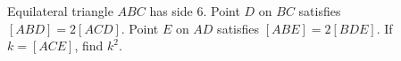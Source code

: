 Equilateral triangle $ABC$ has side $6$. Point $D$ on $BC$ satisfies $[ABD]=2[ACD]$. Point $E$ on $AD$ satisfies $[ABE]=2[BDE]$. If $k=[ACE]$, find $k^2$.
